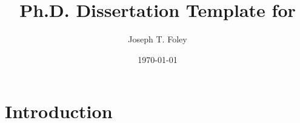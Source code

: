 \documentclass[12pt,a4paper]{memoir}
\title{Ph.D. Dissertation Template for \theInstitution{}}
\author{Joseph T. Foley}%
\date{\today}%
\begin{document}
\maketitle
\copyrightpage{}
\signaturepage{}
\newpage

\mainmatter{}
\chapter{Introduction}
\lipsum[0-20]
\end{document}

